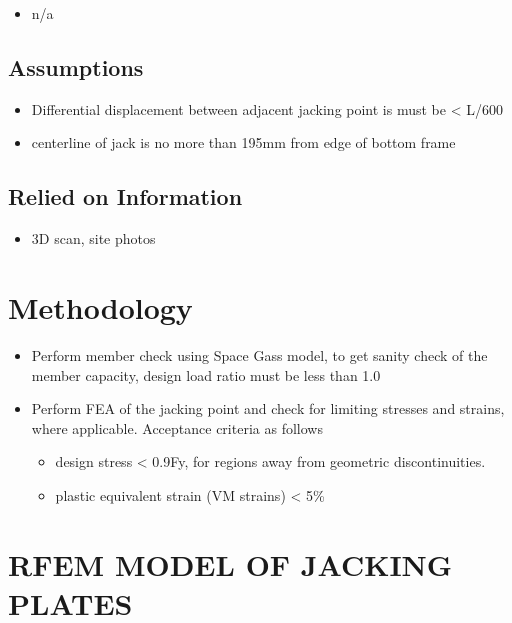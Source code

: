 \documentclass[
  11pt,
  letterpaper,
  DIV=11,
  numbers=noendperiod]{scrartcl}
\providecommand{\tightlist}{%
  \setlength{\itemsep}{0pt}\setlength{\parskip}{0pt}}
\begin{document}
\begin{itemize}
\tightlist
\item
  n/a
\end{itemize}

\subsection{Assumptions}\label{sec-assumptions}

\begin{itemize}
\tightlist
\item
  Differential displacement between adjacent jacking point is must be
  \textless{} L/600
\item
  centerline of jack is no more than 195mm from edge of bottom frame
\end{itemize}

\subsection{Relied on Information}\label{relied-on-information}

\begin{itemize}
\tightlist
\item
  3D scan, site photos
\end{itemize}

\newpage{}

\section{Methodology}\label{methodology}

\begin{itemize}
\tightlist
\item
  Perform member check using Space Gass model, to get sanity check of
  the member capacity, design load ratio must be less than 1.0
\item
  Perform FEA of the jacking point and check for limiting stresses and
  strains, where applicable. Acceptance criteria as follows

  \begin{itemize}
  \tightlist
  \item
    design stress \textless{} 0.9Fy, for regions away from geometric
    discontinuities.
  \item
    plastic equivalent strain (VM strains) \textless{} 5\%
  \end{itemize}
\end{itemize}

\section{RFEM MODEL OF JACKING
PLATES}\label{rfem-model-of-jacking-plates}
\end{document}
